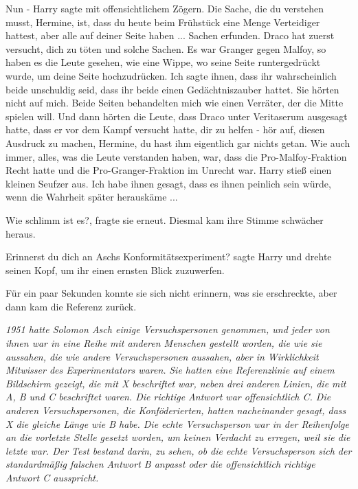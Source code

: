 \glqq{}Nun -\grqq{} Harry sagte mit offensichtlichem Zögern. \glqq{}Die Sache, die
du verstehen musst, Hermine, ist, dass du heute beim Frühstück eine Menge
Verteidiger hattest, aber alle auf deiner Seite haben ... Sachen erfunden. Draco
hat zuerst versucht, dich zu töten und solche Sachen. Es war Granger gegen
Malfoy, so haben es die Leute gesehen, wie eine Wippe, wo seine Seite
runtergedrückt wurde, um deine Seite hochzudrücken. Ich sagte ihnen, dass ihr
wahrscheinlich beide unschuldig seid, dass ihr beide einen Gedächtniszauber
hattet. Sie hörten nicht auf mich. Beide Seiten behandelten mich wie einen
Verräter, der die Mitte spielen will. Und dann hörten die Leute, dass Draco
unter Veritaserum ausgesagt hatte, dass er vor dem Kampf versucht hatte, dir zu
helfen - hör auf, diesen Ausdruck zu machen, Hermine, du hast ihm eigentlich gar
nichts getan. Wie auch immer, alles, was die Leute verstanden haben, war, dass
die Pro-Malfoy-Fraktion Recht hatte und die Pro-Granger-Fraktion im Unrecht
war.\grqq{} Harry stieß einen kleinen Seufzer aus. \glqq{}Ich habe ihnen gesagt,
dass es ihnen peinlich sein würde, wenn die Wahrheit später herauskäme
...\grqq{}

\glqq{}Wie schlimm ist es?\grqq{}, fragte sie erneut. Diesmal kam ihre Stimme
schwächer heraus.

\glqq{}Erinnerst du dich an Aschs Konformitätsexperiment?\grqq{} sagte Harry und
drehte seinen Kopf, um ihr einen ernsten Blick zuzuwerfen.

Für ein paar Sekunden konnte sie sich nicht erinnern, was sie erschreckte, aber
dann kam die Referenz zurück.

\emph{1951 hatte Solomon Asch einige Versuchspersonen genommen, und jeder von
ihnen war in eine Reihe mit anderen Menschen gestellt worden, die wie sie
aussahen, die wie andere Versuchspersonen aussahen, aber in Wirklichkeit
Mitwisser des Experimentators waren.} \emph{Sie hatten eine Referenzlinie auf
einem Bildschirm gezeigt, die mit X beschriftet war, neben drei anderen Linien,
die mit A, B und C beschriftet waren. Die richtige Antwort war offensichtlich C.
Die anderen \glqq{}Versuchspersonen\grqq{}, die Konföderierten, hatten
nacheinander gesagt, dass X die gleiche Länge wie B habe. Die echte
Versuchsperson war in der Reihenfolge an die vorletzte Stelle gesetzt worden, um
keinen Verdacht zu erregen, weil sie die letzte war. Der Test bestand darin, zu
sehen, ob die echte Versuchsperson sich der standardmäßig falschen Antwort B
\glqq{}anpasst\grqq{} oder die offensichtlich richtige Antwort C ausspricht.}

